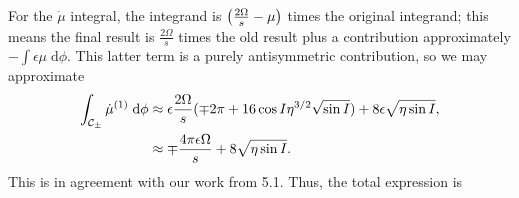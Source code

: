 \documentclass[11pt,
        usenames, %
        dvipsnames %
    ]{article}
\DeclarePairedDelimiter\p{\lparen}{\rparen}
\begin{document}
For the $\dot{\mu}$ integral, the integrand is $\p*{\frac{2\Omega}{s} - \mu}$
times the original integrand; this means the final result is $\frac{2\Omega}{s}$
times the old result plus a contribution approximately $-\int \epsilon \mu
\;\mathrm{d}\phi$. This latter term is a purely antisymmetric contribution, so
we may approximate
\begin{align*}
    \int_{\mathcal{C}_{\pm}}\dot{\mu}^{(1)}\;\mathrm{d}\phi
        &\approx \epsilon\frac{2\Omega}{s}\p{\mp 2\pi
            + 16\cos I \eta^{3/2}\sqrt{\sin I}}
            + 8\epsilon\sqrt{\eta \sin I},\\
        &\approx \mp \frac{4\pi\epsilon \Omega}{s} + 8\sqrt{\eta \sin I}.
\end{align*}
This is in agreement with our work from 5.1. Thus, the total expression is
\end{document}
